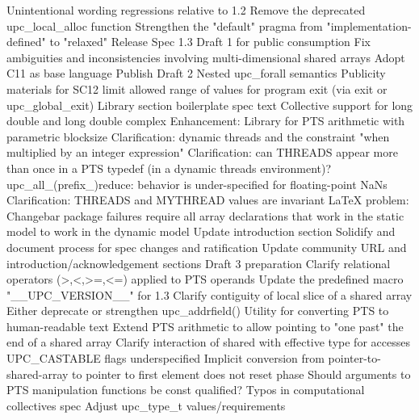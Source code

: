 {      \or %
        Unintentional wording regressions relative to 1.2
      \or %
        Remove the deprecated upc\_local\_alloc function
      \or %
        Strengthen the "default" pragma from "implementation-defined" to "relaxed"
      \or %
        Release Spec 1.3 Draft 1 for public consumption
      \or %
        Fix ambiguities and inconsistencies involving multi-dimensional shared arrays
      \or %
        Adopt C11 as base language
      \or %
        Publish Draft 2
      \or %
        Nested upc\_forall semantics
      \or %
        Publicity materials for SC12
      \or %
        limit allowed range of values for program exit (via exit or upc\_global\_exit)
      \or %
        Library section boilerplate spec text
      \or %
        Collective support for long double and long double complex
      \or %
        Enhancement: Library for PTS arithmetic with parametric blocksize
      \or %
        Clarification: dynamic threads and the constraint "when multiplied by an integer expression"
      \or %
        Clarification: can THREADS appear more than once in a PTS typedef (in a dynamic threads environment)?
      \or %
        upc\_all\_(prefix\_)reduce: behavior is under-specified for floating-point NaNs
      \or %
        Clarification: THREADS and MYTHREAD values are invariant
      \or %
        LaTeX problem: Changebar package failures
      \or %
        require all array declarations that work in the static model to work in the dynamic model
      \or %
        Update introduction section
      \or %
        Solidify and document process for spec changes and ratification
      \or %
        Update community URL and introduction/acknowledgement sections
      \or %
        Draft 3 preparation
      \or %
        Clarify relational operators (>,<,>=,<=) applied to PTS operands
      \or %
        Update the predefined macro "\_\_UPC\_VERSION\_\_" for 1.3
      \or %
        Clarify contiguity of local slice of a shared array
      \or %
        Either deprecate or strengthen upc\_addrfield()
      \or %
        Utility for converting PTS to human-readable text
      \or %
        Extend PTS arithmetic to allow pointing to "one past" the end of a shared array
      \or %
        Clarify interaction of shared with effective type for accesses
      \or %
        UPC\_CASTABLE flags underspecified
      \or %
        Implicit conversion from pointer-to-shared-array to pointer to first element does not reset phase
      \or %
        Should arguments to PTS manipulation functions be const qualified?
      \or %
        Typos in computational collectives spec
      \or %
        Adjust upc\_type\_t values/requirements
    \else
        \empty
    \fi
}
